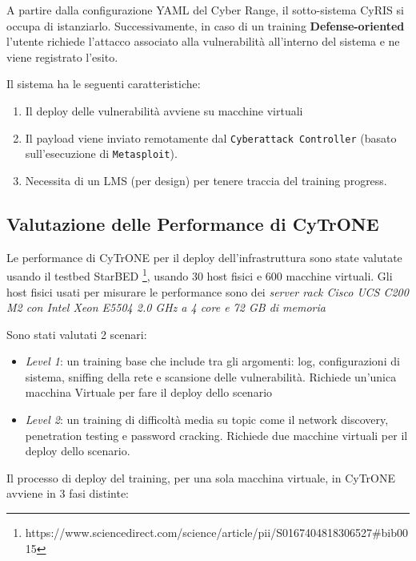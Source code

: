A partire dalla configurazione YAML del Cyber Range, il sotto-sistema
CyRIS si occupa di istanziarlo. Successivamente, in caso di un training
\textbf{Defense-oriented} l'utente richiede l'attacco associato alla
vulnerabilità all'interno del sistema e ne viene registrato l'esito.

Il sistema ha le seguenti caratteristiche:

\begin{enumerate}
\def\labelenumi{\arabic{enumi}.}
\tightlist
\item
  Il deploy delle vulnerabilità avviene su macchine virtuali
\item
  Il payload viene inviato remotamente dal
  \passthrough{\lstinline!Cyberattack Controller!} (basato
  sull'esecuzione di \passthrough{\lstinline!Metasploit!}).
\item
  Necessita di un LMS (per design) per tenere traccia del training
  progress.
\end{enumerate}

\subsection{Valutazione delle Performance di
CyTrONE}\label{valutazione-delle-performance-di-cytrone}

Le performance di CyTrONE per il deploy dell'infrastruttura sono state
valutate usando il testbed StarBED \footnote{\label{fn:ref_10}https://www.sciencedirect.com/science/article/pii/S0167404818306527\#bib0015},
usando 30 host fisici e 600 macchine virtuali. Gli host fisici usati per
misurare le performance sono dei \emph{server rack Cisco UCS C200 M2 con
Intel Xeon E5504 2.0 GHz a 4 core e 72 GB di memoria}

Sono stati valutati 2 scenari:

\begin{itemize}
\tightlist
\item
  \emph{Level 1}: un training base che include tra gli argomenti: log,
  configurazioni di sistema, sniffing della rete e scansione delle
  vulnerabilità. Richiede un'unica macchina Virtuale per fare il deploy
  dello scenario
\item
  \emph{Level 2}: un training di difficoltà media su topic come il
  network discovery, penetration testing e password cracking. Richiede
  due macchine virtuali per il deploy dello scenario.
\end{itemize}

Il processo di deploy del training, per una sola macchina virtuale, in
CyTrONE avviene in 3 fasi distinte:

